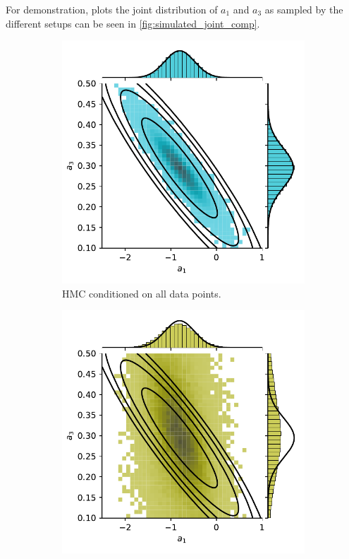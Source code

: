For demonstration, plots the joint distribution of $a_1$ and $a_3$ as sampled by the different setups can be seen in \cref{fig:simulated_joint_comp}.
\begin{figure}[htbp]
    \centering
    \begin{subfigure}[b]{0.45\linewidth}
        \centering
        \includegraphics[width=\linewidth]{Figures/simulated_joint_HMC_15.pdf} 
        \caption{HMC conditioned on all data points.}
    \end{subfigure}
    \begin{subfigure}[b]{0.45\linewidth}
        \centering
        \includegraphics[width=\linewidth]{Figures/simulated_joint_HMC_5.pdf} 

\end{subfigure}
\end{figure}
